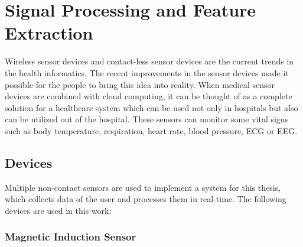 \chapter{Signal Processing and Feature Extraction}

Wireless sensor devices and contact-less sensor devices are the current trends in the health informatics. The recent improvements in the sensor devices made it possible for the people to bring this idea
into reality. When medical sensor devices are combined with cloud computing, it can be thought of as a complete
solution for a healthcare system which can be used not only
in hospitals but also can be utilized out of the hospital.
These sensors can monitor some vital signs such as body temperature, respiration, heart rate, blood pressure, ECG or EEG.

\section{Devices}

Multiple non-contact sensors are used to implement a system for this thesis, which collects data of the user and processes them in real-time. The following devices are used in this work:

\subsection{Magnetic Induction Sensor}

